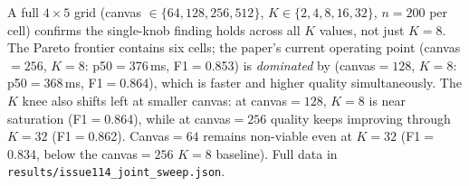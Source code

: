 A full $4\times5$ grid (canvas $\in \{64,128,256,512\}$, $K \in
\{2,4,8,16,32\}$, $n{=}200$ per cell) confirms the single-knob finding
holds across all $K$ values, not just $K{=}8$. The Pareto frontier
contains six cells; the paper's current operating point (canvas$=256$,
$K{=}8$: p50$=$376\,ms, F1$=$0.853) is \emph{dominated} by
(canvas$=128$, $K{=}8$: p50$=$368\,ms, F1$=$0.864), which is faster
and higher quality simultaneously. The $K$ knee also shifts left at
smaller canvas: at canvas$=128$, $K{=}8$ is near saturation
(F1$=$0.864), while at canvas$=256$ quality keeps improving through
$K{=}32$ (F1$=$0.862). Canvas$=64$ remains non-viable even at $K{=}32$
(F1$=$0.834, below the canvas$=256$ $K{=}8$ baseline). Full data in
\texttt{results/issue114\_joint\_sweep.json}.
